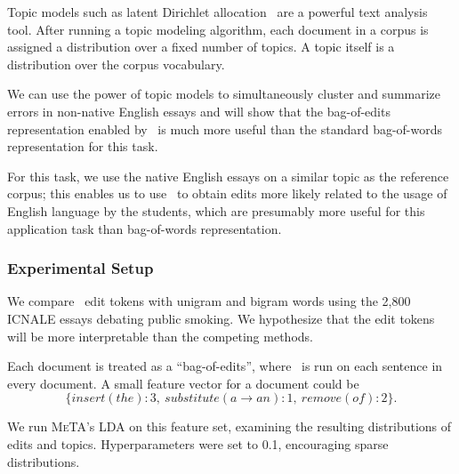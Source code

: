 Topic models such as latent Dirichlet allocation~\cite{lda} are a powerful text
analysis tool. After running a topic modeling algorithm, each document in a
corpus is assigned a distribution over a fixed number of topics. A topic itself
is a distribution over the corpus vocabulary.

We can use the power of topic models to simultaneously cluster and summarize
errors in non-native English essays and will show that the bag-of-edits
representation enabled by \sd~is much more useful than the standard bag-of-words
representation for this task.  For this task, we use the native English essays on a
similar topic as the reference corpus; this enables us to use \sd~to obtain
edits more likely related to the usage of English language by the students,
which are presumably more useful for this application task than bag-of-words
representation.

\subsubsection{Experimental Setup}

We compare \sd~edit tokens with unigram and bigram words using the 2,800
ICNALE essays debating public smoking. We hypothesize that the edit tokens
will be more interpretable than the competing methods.

Each document is treated as a ``bag-of-edits'', where \sd~is run on each
sentence in every document. A small feature vector for a document could be
$$\{insert(the): 3,\: substitute(a\rightarrow an): 1,\: remove(of): 2\}.$$

We run \textsc{MeTA}'s LDA on this feature set, examining the resulting
distributions of edits and topics. Hyperparameters were set to 0.1, encouraging
sparse distributions.


